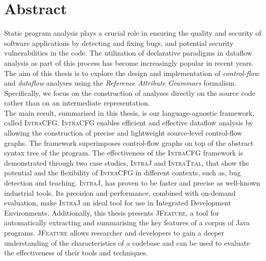 \chapter{Abstract}


Static program analysis plays a crucial role in ensuring the quality and security of
software applications by detecting and fixing bugs,
and potential security vulnerabilities in the code. The utilization of declarative paradigms
in dataflow analysis as part of this process has become increasingly popular in recent years.\\[5pt]

The aim of this thesis is to explore the design and implementation of \emph{control-flow} and 
\emph{dataflow} analyses using the \emph{Reference Attribute Grammars} formalism.
Specifically, we focus on the construction of analyses directly on the source code
rather than on an intermediate representation.\\[5pt]

The main result, summarised in this thesis, is our language-agnostic framework, called \textsc{IntraCFG}.
\textsc{IntraCFG} enables efficient and effective dataflow analysis by allowing the construction of precise and
lightweight source-level control-flow graphs. The framework superimposes control-flow
graphs on top of the abstract syntax tree of the program. The effectiveness of the \textsc{IntraCFG} framework is
demonstrated through two case studies, \textsc{IntraJ} and \textsc{IntraTeal}, that
show the potential and the flexibility of \textsc{IntraCFG} in different contexts,
such as, bug detection and teaching.
\textsc{IntraJ}, has proven to be faster and precise as well-known
industrial tools. Its precision and performance, combined with
on-demand evaluation, make \textsc{IntraJ} an ideal tool for use in
Integrated Development Environments.
Additionally, this thesis presents \textsc{JFeature}, a tool for automatically extracting
and summarising the key features of a corpus of Java programs. \textsc{JFeature} allows
researcher and developers to gain a deeper understanding of the characteristics of a codebase and
can be used to evaluate the effectiveness of their tools and techniques.
